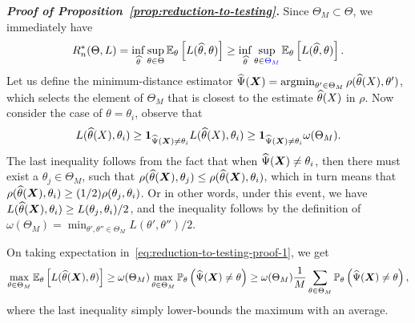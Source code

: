 \documentclass[12pt]{article}
\begin{document}
\emph{\textbf{Proof of Proposition~\ref{prop:reduction-to-testing}.}} Since $\Theta_M \subset\Theta$, we immediately have 
\begin{align}
R_n^*(\Theta, L) = \inf_{\widehat{\theta}} \sup_{\theta \in \Theta} \mathbb{E}_\theta\left[ L(\widehat{\theta}, \theta) \right] \geq \inf_{\widehat{\theta}} \sup_{\theta \in \textcolor{blue}{\Theta_M}} \mathbb{E}_\theta\left[ L(\widehat{\theta}, \theta) \right]. 
\end{align}
Let us define the minimum-distance estimator $\widehat{\Psi}({\boldsymbol X}) = \operatorname*{argmin}_{\theta' \in \Theta_M} \rho(\widehat{\theta}(X), \theta')$, which selects the element of $\Theta_M$ that is closest to the estimate $\widehat{\theta}(X)$ in $\rho$. Now consider the case of $\theta=\theta_i$, observe that 
\begin{align}
L(\widehat{\theta}(X), \theta_i) \geq \boldsymbol{1}_{\widehat{\Psi}({\boldsymbol X}) \neq \theta_i} L(\widehat{\theta}(X), \theta_i) \geq \boldsymbol{1}_{\widehat{\Psi}({\boldsymbol X}) \neq \theta_i} \omega(\Theta_M). \label{eq:reduction-to-testing-proof-1}
\end{align}
The last inequality follows from the fact that when $\widehat{\Psi}({\boldsymbol X}) \neq \theta_i$, then there must exist a $\theta_j \in \Theta_M$, such that $\rho(\widehat{\theta}({\boldsymbol X}), \theta_j) \leq \rho(\widehat{\theta}({\boldsymbol X}), \theta_i)$, which in turn means that $\rho(\widehat{\theta}({\boldsymbol X}), \theta_i) \geq (1/2) \rho(\theta_j, \theta_i)$. Or in other words, under this event, we have $L(\widehat{\theta}({\boldsymbol X}), \theta_i) \geq L(\theta_j, \theta_i)/2$, and the inequality follows by the definition of $\omega(\Theta_M) = \min_{\theta', \theta'' \in \Theta_M} L(\theta', \theta'')/2$. 

On taking expectation in~\eqref{eq:reduction-to-testing-proof-1}, we get 
\begin{align}
\max_{\theta\in \Theta_M} \mathbb{E}_\theta \left[ L(\widehat{\theta}({\boldsymbol X}), \theta) \right] \geq \omega(\Theta_M) \max_{\theta \in \Theta_M}\mathbb{P}_\theta \left( \widehat{\Psi}({\boldsymbol X}) \neq \theta \right) \geq \omega(\Theta_M) \frac{1}{M} \sum_{\theta \in \Theta_M}\mathbb{P}_\theta \left( \widehat{\Psi}({\boldsymbol X}) \neq \theta \right), 
\end{align}
where the last inequality simply lower-bounds the maximum with an average. 
\end{document}
